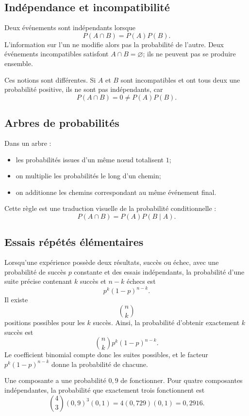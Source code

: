 \subsection{Indépendance et incompatibilité}

Deux événements sont indépendants lorsque
\[
P(A\cap B)=P(A)P(B).
\]
L'information sur l'un ne modifie alors pas la probabilité de l'autre. Deux événements incompatibles satisfont $A\cap B=\varnothing$; ils ne peuvent pas se produire ensemble.

Ces notions sont différentes. Si $A$ et $B$ sont incompatibles et ont tous deux une probabilité positive, ils ne sont pas indépendants, car
\[
P(A\cap B)=0\neq P(A)P(B).
\]

\subsection{Arbres de probabilités}

Dans un arbre :
\begin{itemize}
\item les probabilités issues d'un même nœud totalisent $1$;
\item on multiplie les probabilités le long d'un chemin;
\item on additionne les chemins correspondant au même événement final.
\end{itemize}

Cette règle est une traduction visuelle de la probabilité conditionnelle :
\[
P(A\cap B)=P(A)P(B\mid A).
\]

\subsection{Essais répétés élémentaires}

Lorsqu'une expérience possède deux résultats, succès ou échec, avec une probabilité de succès $p$ constante et des essais indépendants, la probabilité d'une suite précise contenant $k$ succès et $n-k$ échecs est
\[
p^k(1-p)^{n-k}.
\]
Il existe
\[
\binom nk
\]
positions possibles pour les $k$ succès. Ainsi, la probabilité d'obtenir exactement $k$ succès est
\[
\binom nkp^k(1-p)^{n-k}.
\]
Le coefficient binomial compte donc les suites possibles, et le facteur $p^k(1-p)^{n-k}$ donne la probabilité de chacune.

\begin{examplebox}
Une composante a une probabilité $0{,}9$ de fonctionner. Pour quatre composantes indépendantes, la probabilité que exactement trois fonctionnent est
\[
\binom43(0{,}9)^3(0{,}1)=4(0{,}729)(0{,}1)=0{,}2916.
\]
\end{examplebox}

